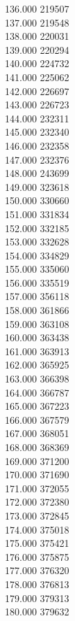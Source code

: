 { 136.000	219507 \\
 137.000	219548 \\
 138.000	220031 \\
 139.000	220294 \\
 140.000	224732 \\
 141.000	225062 \\
 142.000	226697 \\
 143.000	226723 \\
 144.000	232311 \\
 145.000	232340 \\
 146.000	232358 \\
 147.000	232376 \\
 148.000	243699 \\
 149.000	323618 \\
 150.000	330660 \\
 151.000	331834 \\
 152.000	332185 \\
 153.000	332628 \\
 154.000	334829 \\
 155.000	335060 \\
 156.000	335519 \\
 157.000	356118 \\
 158.000	361866 \\
 159.000	363108 \\
 160.000	363438 \\
 161.000	363913 \\
 162.000	365925 \\
 163.000	366398 \\
 164.000	366787 \\
 165.000	367223 \\
 166.000	367579 \\
 167.000	368051 \\
 168.000	368369 \\
 169.000	371200 \\
 170.000	371690 \\
 171.000	372055 \\
 172.000	372380 \\
 173.000	372845 \\
 174.000	375018 \\
 175.000	375421 \\
 176.000	375875 \\
 177.000	376320 \\
 178.000	376813 \\
 179.000	379313 \\
 180.000	379632 \\
}
